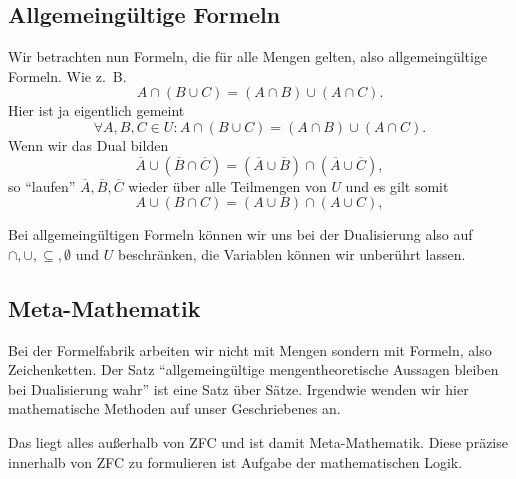\documentclass[a4paper]{amsart}
\theoremstyle{definition}
\newcommand{\zb}{z.~B. }
\begin{document}
\subsection{Allgemeingültige Formeln}
Wir betrachten nun Formeln, die für alle Mengen gelten, also allgemeingültige Formeln. Wie \zb
\begin{equation}\label{Dist}
   A \cap (B \cup C) = (A \cap B) \cup (A \cap C).
\end{equation}
Hier ist ja eigentlich gemeint
\begin{equation}\label{DistForall}
   \forall A, B, C  \in U \colon A \cap (B \cup C) = (A \cap B) \cup (A \cap C).
\end{equation}
Wenn wir das Dual bilden
\begin{equation}\label{DistDual}
   \overline A \cup (\overline B \cap \overline C) = (\overline A \cup \overline B) \cap (\overline A \cup \overline C),
\end{equation}
so "`laufen"' $\overline A, \overline B, \overline C$ wieder über alle Teilmengen von $U$ und es gilt somit
\begin{equation}\label{Distcup}
   A \cup (B \cap C) = (A \cup B) \cap (A \cup C),
\end{equation}

Bei allgemeingültigen Formeln können wir uns bei der Dualisierung also auf $\cap, \cup, \subseteq, \emptyset$ und $U$ beschränken, die Variablen können wir unberührt lassen.

\subsection{Meta-Mathematik}
Bei der Formelfabrik arbeiten wir nicht mit Mengen sondern mit Formeln, also Zeichenketten. Der Satz "`allgemeingültige mengentheoretische Aussagen bleiben bei Dualisierung wahr"' ist eine Satz über Sätze. Irgendwie wenden wir hier mathematische Methoden auf unser Geschriebenes an.

Das liegt alles außerhalb von ZFC und ist damit Meta-Mathematik. Diese präzise innerhalb von ZFC zu formulieren ist Aufgabe der mathematischen Logik. 
\end{document}

